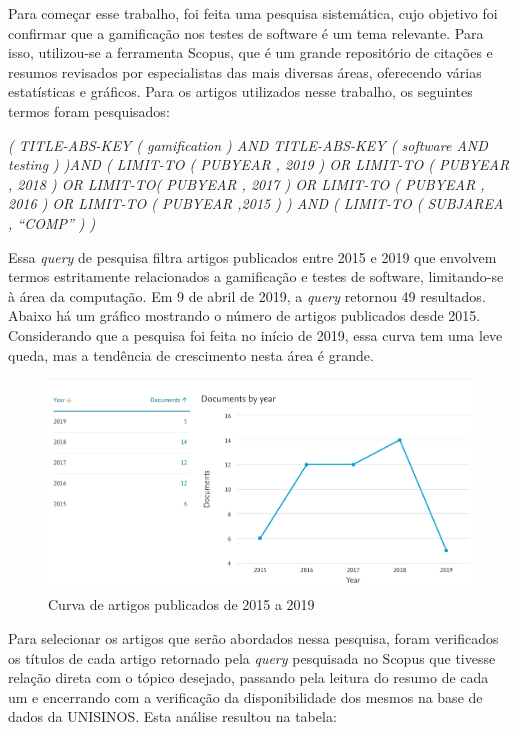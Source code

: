 \documentclass[twoside,english,brazilian]{UNISINOSartigo}
\begin{document}
Para come\c{c}ar esse trabalho, foi feita uma pesquisa sistem\'{a}tica, cujo objetivo foi confirmar que a gamifica\c{c}\~{a}o nos testes de software \'{e} um tema relevante. Para isso, utilizou-se a ferramenta Scopus, que \'{e} um grande reposit\'{o}rio de cita\c{c}\~{o}es e resumos revisados por especialistas das mais diversas \'{a}reas, oferecendo  v\'{a}rias estat\'{i}sticas e gr\'{a}ficos. Para os artigos utilizados nesse trabalho, os seguintes termos foram pesquisados:

\textit{( TITLE-ABS-KEY ( gamification ) AND TITLE-ABS-KEY ( software AND testing ) )AND ( LIMIT-TO ( PUBYEAR , 2019 ) OR LIMIT-TO ( PUBYEAR , 2018 ) OR LIMIT-TO( PUBYEAR , 2017 ) OR LIMIT-TO ( PUBYEAR , 2016 ) OR LIMIT-TO ( PUBYEAR ,2015 ) ) AND ( LIMIT-TO ( SUBJAREA , ``COMP'' ) )}

Essa \textit{query} de pesquisa filtra artigos publicados entre 2015 e 2019 que envolvem termos estritamente relacionados a gamifica\c{c}\~{a}o e testes de software, limitando-se \`{a} \'{a}rea da computa\c{c}\~{a}o. Em 9 de abril de 2019, a \textit{query} retornou 49 resultados. Abaixo h\'{a} um gr\'{a}fico mostrando o n\'{u}mero de artigos publicados desde 2015. Considerando que a pesquisa foi feita no in\'{i}cio de 2019, essa curva tem uma leve queda, mas a tend\^{e}ncia de crescimento nesta \'{a}rea \'{e} grande.


\begin{figure}[!htbp]
	\caption{Curva de artigos publicados de 2015 a 2019}
	\label{fig:imagens/pubByYear.png}
	\centering%
		\includegraphics[width=\textwidth]{imagens/pubByYear.png}
\end{figure}

Para selecionar os artigos que ser\~{a}o abordados nessa pesquisa, foram verificados os t\'{i}tulos de cada artigo retornado pela \textit{query} pesquisada no Scopus que tivesse rela\c{c}\~{a}o direta com o t\'{o}pico desejado, passando pela leitura do resumo de cada um e encerrando com a verifica\c{c}\~{a}o da disponibilidade dos mesmos na base de dados da UNISINOS. Esta an\'{a}lise resultou na tabela:
\end{document}
